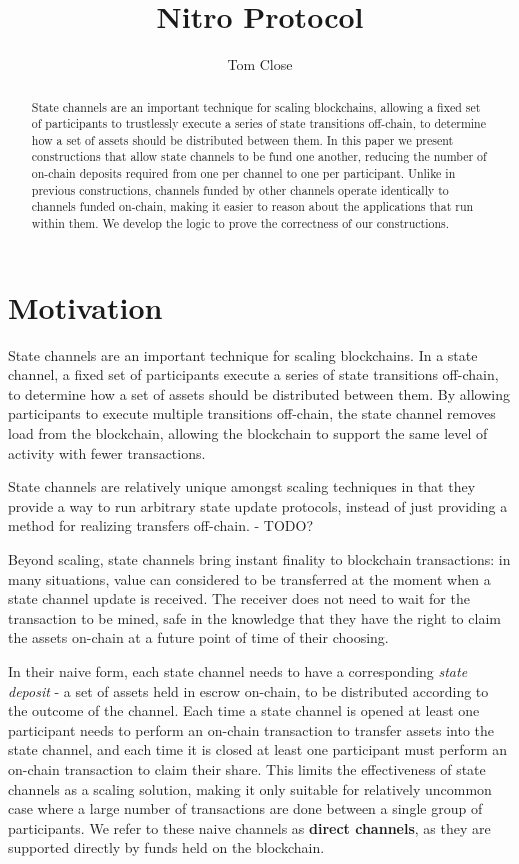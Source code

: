 \documentclass{article}
\title{Nitro Protocol}
\author{Tom Close}
\begin{document}
\maketitle
\begin{abstract}
  State channels are an important technique for scaling blockchains, allowing a fixed set of participants to trustlessly execute a series of state transitions off-chain, to determine how a set of assets should be distributed between them.
  In this paper we present constructions that allow state channels to be fund one another, reducing the number of on-chain deposits required from one per channel to one per participant.
  Unlike in previous constructions, channels funded by other channels operate identically to channels funded on-chain, making it easier to reason about the applications that run within them.
  We develop the logic to prove the correctness of our constructions.
\end{abstract}

\section{Motivation}

State channels are an important technique for scaling blockchains.
In a state channel, a fixed set of participants execute a series of state transitions off-chain, to determine how a set of assets should be distributed between them.
By allowing participants to execute multiple transitions off-chain, the state channel removes load from the blockchain, allowing the blockchain to support the same level of activity with fewer transactions.

State channels are relatively unique amongst scaling techniques in that they provide a way to run arbitrary state update protocols, instead of just providing a method for realizing transfers off-chain.
- TODO?

Beyond scaling, state channels bring instant finality to blockchain transactions:
in many situations, value can considered to be transferred at the moment when a state channel update is received.
The receiver does not need to wait for the transaction to be mined, safe in the knowledge
that they have the right to claim the assets on-chain at a future point of time of their choosing.

In their naive form, each state channel needs to have a corresponding \textit{state deposit} - a set of assets held in escrow on-chain, to be distributed according to the outcome of the channel.
Each time a state channel is opened at least one participant needs to perform an on-chain transaction to transfer assets into the state channel, and each time it is closed at least one participant must perform an on-chain transaction to claim their share.
This limits the effectiveness of state channels as a scaling solution, making it only suitable for relatively uncommon case where a large number of transactions are done between a single group of participants.
We refer to these naive channels as \textbf{direct channels}, as they are supported directly by funds held on the blockchain.
\end{document}

